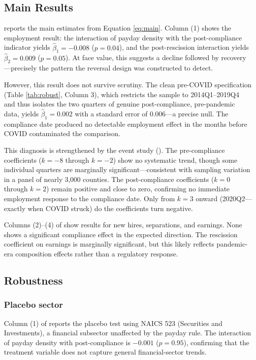 \documentclass[12pt]{article}
\begin{document}
\subsection{Main Results}



 reports the main estimates from Equation \ref{eq:main}. Column (1) shows the employment result: the interaction of payday density with the post-compliance indicator yields $\hat{\beta}_1 = -0.008$ ($p = 0.04$), and the post-rescission interaction yields $\hat{\beta}_2 = 0.009$ ($p = 0.05$). At face value, this suggests a decline followed by recovery---precisely the pattern the reversal design was constructed to detect.

However, this result does not survive scrutiny. The clean pre-COVID specification (Table \ref{tab:robust}, Column 3), which restricts the sample to 2014Q1--2019Q4 and thus isolates the two quarters of genuine post-compliance, pre-pandemic data, yields $\hat{\beta}_1 = 0.002$ with a standard error of 0.006---a precise null. The compliance date produced no detectable employment effect in the months before COVID contaminated the comparison.

This diagnosis is strengthened by the event study (). The pre-compliance coefficients ($k = -8$ through $k = -2$) show no systematic trend, though some individual quarters are marginally significant---consistent with sampling variation in a panel of nearly 3,000 counties. The post-compliance coefficients ($k = 0$ through $k = 2$) remain positive and close to zero, confirming no immediate employment response to the compliance date. Only from $k = 3$ onward (2020Q2---exactly when COVID struck) do the coefficients turn negative.



Columns (2)--(4) of  show results for new hires, separations, and earnings. None shows a significant compliance effect in the expected direction. The rescission coefficient on earnings is marginally significant, but this likely reflects pandemic-era composition effects rather than a regulatory response.

\subsection{Robustness}



\subsubsection*{Placebo sector} Column (1) of  reports the placebo test using NAICS 523 (Securities and Investments), a financial subsector unaffected by the payday rule. The interaction of payday density with post-compliance is $-0.001$ ($p = 0.95$), confirming that the treatment variable does not capture general financial-sector trends.
\end{document}
